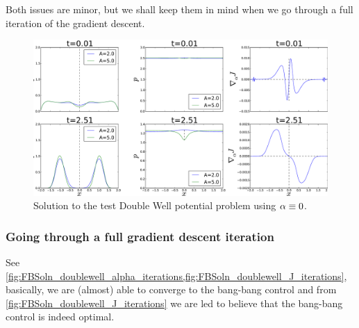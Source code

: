 \documentclass{article}
\begin{document}
Both issues are minor, but we shall keep them in mind when we go through a full
iteration of the gradient descent. 
\begin{figure}[htp] 
\begin{center}  
  \includegraphics[width=.9\textwidth]{Figs/DoublewellFBSolver/FB_alpha_null_solution_2.pdf}
  \caption[labelInTOC]{Solution to the test Double Well potential problem using
  ${\alpha} \equiv 0$. }
  \label{fig:FBSoln_doublewell_alpha_null}
\end{center}
\end{figure} 

\subsubsection{Going through a full gradient descent iteration}
See
\cref{fig:FBSoln_doublewell_alpha_iterations,fig:FBSoln_doublewell_J_iterations},
basically, we are (almost) able to converge to the bang-bang control and from
\cref{fig:FBSoln_doublewell_J_iterations} we are led to believe that the
bang-bang control is indeed optimal. 
\end{document}
